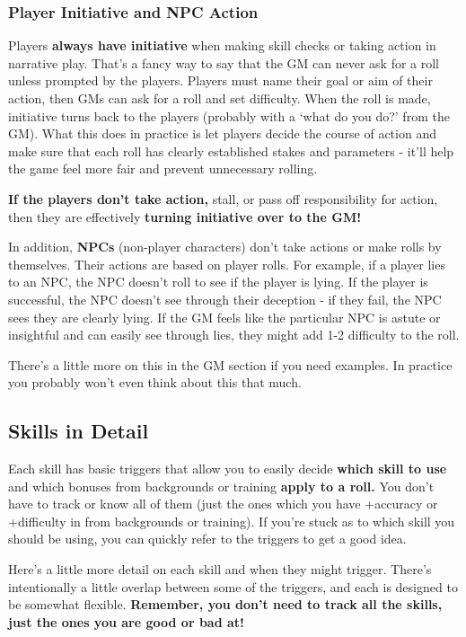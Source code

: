 \subsubsection{Player Initiative and NPC Action}

Players \textbf{always have initiative} when making skill checks or taking action in narrative play. That’s a fancy way to say that the GM can never ask for a roll unless prompted by the players. Players must name their goal or aim of their action, then GMs can ask for a roll and set difficulty. When the roll is made, initiative turns back to the players (probably with a ‘what do you do?’ from the GM). What this does in practice is let players decide the course of action and make sure that each roll has clearly established stakes and parameters - it’ll help the game feel more fair and prevent unnecessary rolling. 

\textbf{If the players don’t take action,} stall, or pass off responsibility for action, then they are effectively \textbf{turning initiative over to the GM!} 

In addition, \textbf{NPCs} (non-player characters) don’t take actions or make rolls by themselves. Their actions are based on player rolls. For example, if a player lies to an NPC, the NPC doesn’t roll to see if the player is lying. If the player is successful, the NPC doesn’t see through their deception - if they fail, the NPC sees they are clearly lying. If the GM feels like the particular NPC is astute or insightful and can easily see through lies, they might add 1-2 difficulty to the roll.

There’s a little more on this in the GM section if you need examples. In practice you probably won’t even think about this that much.

\subsection{Skills in Detail}

Each skill has basic triggers that allow you to easily decide \textbf{which skill to use} and which bonuses from backgrounds or training \textbf{apply to a roll.} You don’t have to track or know all of them (just the ones which you have +accuracy or +difficulty in from backgrounds or training). If you’re stuck as to which skill you should be using, you can quickly refer to the triggers to get a good idea. 

Here’s a little more detail on each skill and when they might trigger. There’s intentionally a little overlap between some of the triggers, and each is designed to be somewhat flexible. \textbf{Remember, you don’t need to track all the skills, just the ones you are good or bad at!} 

